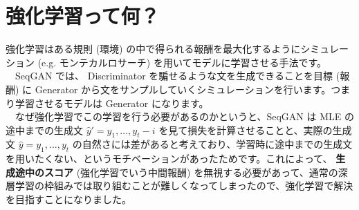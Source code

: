 \documentclass[a4paper, dvipdfmx, 10pt]{article}
\begin{document}
\section{強化学習って何？}
\label{sec:org42a2415}
強化学習はある規則 (環境) の中で得られる報酬を最大化するようにシミュレーション (e.g. モンテカルロサーチ) を用いてモデルに学習させる手法です。\\
　SeqGAN では、 Discriminator を騙せるような文を生成できることを目標 (報酬) に Generator から文をサンプルしていくシミュレーションを行います。つまり学習させるモデルは Generator になります。\\
　なぜ強化学習でこの学習を行う必要があるのかというと、SeqGAN は MLE の途中までの生成文 \(\hat{y}' = {y_1, \dots, y_t - i}\) を見て損失を計算させることと、実際の生成文 \(\hat{y} = {y_1, \dots, y_t}\) の自然さには差があると考えており、学習時に途中までの生成文を用いたくない、というモチベーションがあったためです。これによって、 \textbf{生成途中のスコア} (強化学習でいう中間報酬) を無視する必要があって、通常の深層学習の枠組みでは取り組むことが難しくなってしまったので、強化学習で解決を目指すことになりました。
\end{document}
